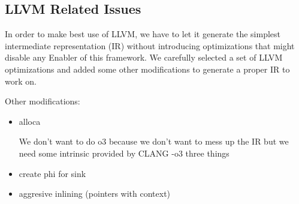 



\subsection{LLVM Related Issues}

In order to make best use of LLVM, we have to let it generate the simplest
intermediate representation (IR) without introducing optimizations that might
disable any Enabler of this framework. We carefully selected a set of LLVM
optimizations and added some other modifications to generate a proper IR to work
on.

Other modifications:

\begin{itemize}
\item alloca

We don’t want to do o3 because we don’t want to mess up the IR but we need some
intrinsic provided by CLANG -o3 three things

\item create phi for sink
\item aggresive inlining (pointers with context)
\end{itemize}
